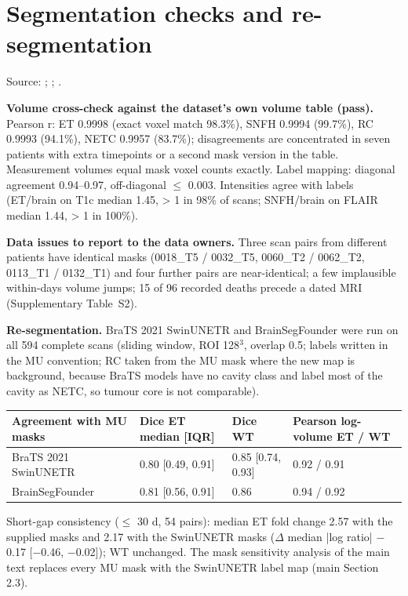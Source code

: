 \documentclass[11pt,a4paper]{article}
\begin{document}
\FloatBarrier
\section{Segmentation checks and re-segmentation}\label{sec:S14}

Source: ;
;
.

\textbf{Volume cross-check against the dataset's own volume table (pass).} Pearson r: ET 0.9998 (exact voxel
match 98.3\%), SNFH 0.9994 (99.7\%), RC 0.9993 (94.1\%), NETC 0.9957 (83.7\%); disagreements are concentrated
in seven patients with extra timepoints or a second mask version in the table. Measurement volumes equal mask
voxel counts exactly. Label mapping: diagonal agreement 0.94--0.97, off-diagonal $\leq$ 0.003. Intensities
agree with labels (ET/brain on T1c median 1.45, > 1 in 98\% of scans; SNFH/brain on FLAIR median 1.44, > 1 in
100\%).

\textbf{Data issues to report to the data owners.} Three scan pairs from different patients have identical
masks (0018\_T5 / 0032\_T5, 0060\_T2 / 0062\_T2, 0113\_T1 / 0132\_T1) and four further pairs are
near-identical; a few implausible within-days volume jumps; 15 of 96 recorded deaths precede a dated MRI (Supplementary Table~S2).

\textbf{Re-segmentation.} BraTS 2021 SwinUNETR \citep{hatamizadeh2022} and BrainSegFounder \citep{cox2024} were run on all 594 complete scans (sliding
window, ROI 128$^{3}$, overlap 0.5; labels written in the MU convention; RC taken from the MU mask where the
new map is background, because BraTS models have no cavity class and label most of the cavity as NETC, so
tumour core is not comparable).

\begin{table}[H]
\centering
\small
\begin{tabularx}{\linewidth}{@{}L R{3.07cm} R{3.07cm} R{2.20cm}@{}}
\toprule
Agreement with MU masks & Dice ET median [IQR] & Dice WT & Pearson log-volume ET / WT \\
\midrule
BraTS 2021 SwinUNETR & 0.80 [0.49, 0.91] & 0.85 [0.74, 0.93] & 0.92 / 0.91 \\
BrainSegFounder & 0.81 [0.56, 0.91] & 0.86 & 0.94 / 0.92 \\
\bottomrule
\end{tabularx}
\end{table}

Short-gap consistency ($\leq$ 30 d, 54 pairs): median ET fold change 2.57 with the supplied masks and 2.17
with the SwinUNETR masks ($\Delta$ median |log ratio| $-$0.17 [$-$0.46, $-$0.02]); WT unchanged. The mask
sensitivity analysis of the main text replaces every MU mask with the SwinUNETR label map (main Section 2.3).
\end{document}
